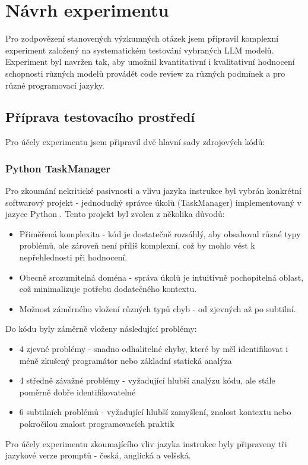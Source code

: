 \documentclass[12pt, a4paper]{article}
\begin{document}
\section{Návrh experimentu}
Pro zodpovězení stanovených výzkumných otázek jsem připravil komplexní experiment založený na systematickém testování vybraných LLM modelů. Experiment byl navržen tak, aby umožnil kvantitativní i kvalitativní hodnocení schopnosti různých modelů provádět code review za různých podmínek a pro různé programovací jazyky.
\subsection{Příprava testovacího prostředí}
Pro účely experimentu jsem připravil dvě hlavní sady zdrojových kódů:
\subsubsection{Python TaskManager}
Pro zkoumání nekritické pasivnosti a vlivu jazyka instrukce byl vybrán konkrétní softwarový projekt - jednoduchý správce úkolů (TaskManager) implementovaný v jazyce Python \cite{pospisil2025}. Tento projekt byl zvolen z několika důvodů:
\begin{itemize}
\item Přiměřená komplexita - kód je dostatečně rozsáhlý, aby obsahoval různé typy problémů, ale zároveň není příliš komplexní, což by mohlo vést k nepřehlednosti při hodnocení.
\item Obecně srozumitelná doména - správa úkolů je intuitivně pochopitelná oblast, což minimalizuje potřebu dodatečného kontextu.
\item Možnost záměrného vložení různých typů chyb - od zjevných až po subtilní.
\end{itemize}
Do kódu byly záměrně vloženy následující problémy:
\begin{itemize}
\item 4 zjevné problémy - snadno odhalitelné chyby, které by měl identifikovat i méně zkušený programátor nebo základní statická analýza
\item 4 středně závažné problémy - vyžadující hlubší analýzu kódu, ale stále poměrně dobře identifikovatelné
\item 6 subtilních problémů - vyžadující hlubší zamyšlení, znalost kontextu nebo pokročilou znalost programovacích praktik
\end{itemize}
Pro účely experimentu zkoumajícího vliv jazyka instrukce byly připraveny tři jazykové verze promptů - česká, anglická a velšská.
\end{document}
